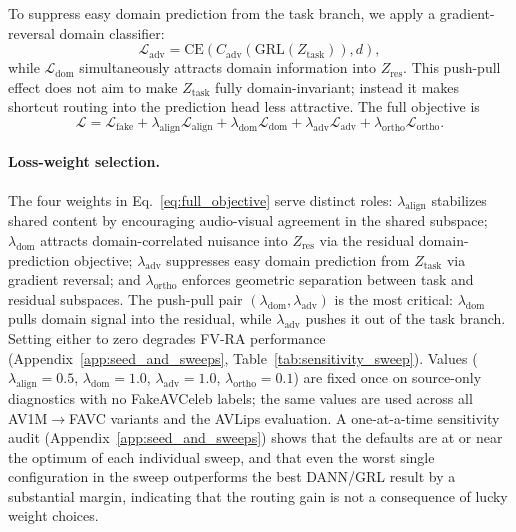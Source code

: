 \documentclass{article}
\begin{document}
To suppress easy domain prediction from the task branch, we apply a gradient-reversal domain classifier:
\begin{equation}
\mathcal{L}_{\mathrm{adv}} =
\mathrm{CE}(C_{\mathrm{adv}}(\mathrm{GRL}(Z_{\mathrm{task}})), d),
\end{equation}
while $\mathcal{L}_{\mathrm{dom}}$ simultaneously attracts domain information into $Z_{\mathrm{res}}$. This push-pull effect does not aim to make $Z_{\mathrm{task}}$ fully domain-invariant; instead it makes shortcut routing into the prediction head less attractive.
The full objective is
\begin{equation}
\mathcal{L}
=
\mathcal{L}_{\mathrm{fake}}
+
\lambda_{\mathrm{align}} \mathcal{L}_{\mathrm{align}}
+
\lambda_{\mathrm{dom}} \mathcal{L}_{\mathrm{dom}}
+
\lambda_{\mathrm{adv}} \mathcal{L}_{\mathrm{adv}}
+
\lambda_{\mathrm{ortho}} \mathcal{L}_{\mathrm{ortho}}.
\label{eq:full_objective}
\end{equation}
\vspace{-0.7em}
\paragraph{Loss-weight selection.}
The four weights in Eq.~\eqref{eq:full_objective} serve distinct roles: $\lambda_{\mathrm{align}}$ stabilizes shared content by encouraging audio-visual agreement in the shared subspace; $\lambda_{\mathrm{dom}}$ attracts domain-correlated nuisance into $Z_{\mathrm{res}}$ via the residual domain-prediction objective; $\lambda_{\mathrm{adv}}$ suppresses easy domain prediction from $Z_{\mathrm{task}}$ via gradient reversal; and $\lambda_{\mathrm{ortho}}$ enforces geometric separation between task and residual subspaces. The push-pull pair $(\lambda_{\mathrm{dom}}, \lambda_{\mathrm{adv}})$ is the most critical: $\lambda_{\mathrm{dom}}$ pulls domain signal into the residual, while $\lambda_{\mathrm{adv}}$ pushes it out of the task branch. Setting either to zero degrades FV-RA performance (Appendix~\ref{app:seed_and_sweeps}, Table~\ref{tab:sensitivity_sweep}). Values ($\lambda_{\mathrm{align}}{=}0.5$, $\lambda_{\mathrm{dom}}{=}1.0$, $\lambda_{\mathrm{adv}}{=}1.0$, $\lambda_{\mathrm{ortho}}{=}0.1$) are fixed once on source-only diagnostics with no FakeAVCeleb labels; the same values are used across all AV1M$\rightarrow$FAVC variants and the AVLips evaluation. A one-at-a-time sensitivity audit (Appendix~\ref{app:seed_and_sweeps}) shows that the defaults are at or near the optimum of each individual sweep, and that even the worst single configuration in the sweep outperforms the best DANN/GRL result by a substantial margin, indicating that the routing gain is not a consequence of lucky weight choices.
\end{document}
